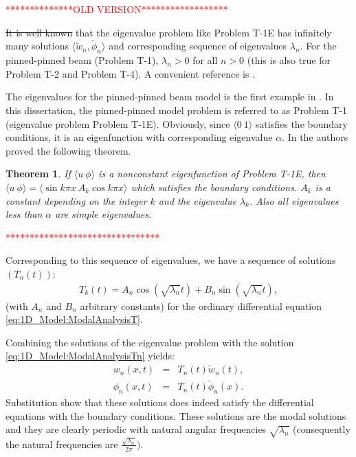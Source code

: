 \documentclass[../../main.tex]{subfiles}
\begin{document}
\textcolor{red}{**************OLD VERSION******************}

\sout{It is well known} that the eigenvalue problem like Problem T-1E has infinitely many solutions $\langle \tilde{w}_n, \tilde{\phi}_n \rangle$ and corresponding sequence of eigenvalues $\lambda_n$. For the pinned-pinned beam (Problem T-1), $\lambda_n > 0$ for all $n > 0$ (this is also true for Problem T-2 and Problem T-4). A convenient reference is \cite{VV06}.

The eigenvalues for the pinned-pinned beam model is the first example in \cite{VV06}. In this dissertation, the pinned-pinned model problem is referred to as Problem T-1 (eigenvalue problem Problem T-1E). Obviously, since $\langle 0 \ 1\rangle$ satisfies the boundary conditions, it is an eigenfunction with corresponding eigenvalue $\alpha$. In \cite{VV06} the authors proved the following theorem.

\newtheorem{ThmVV06_2}{Theorem}
\begin{ThmVV06_2}
	If $\langle u \ \phi\rangle$ is a nonconstant eigenfunction of Problem T-1E, then $\langle u \ \phi\rangle = \langle\sin k \pi x \ A_k \cos k \pi x\rangle$ which satisfies the boundary conditions. $A_k$ is a constant depending on the integer $k$ and the eigenvalue $\lambda_k$. Also all eigenvalues less than $\alpha$ are simple eigenvalues.
\end{ThmVV06_2}

\textcolor{red}{********************************} 

Corresponding to this sequence of eigenvalues, we have a sequence of solutions $(T_n(t))$:
\begin{eqnarray}
	T_k(t)=A_n\cos(\sqrt{\lambda_n}t)+B_n\sin(\sqrt{\lambda_n}t), \label{eq:1D_Model:ModalAnalysisTn}
\end{eqnarray}
(with $A_n$ and $B_n$ arbitrary constants) for the ordinary differential equation \eqref{eq:1D_Model:ModalAnalysisT}.

Combining the solutions of the eigenvalue problem with the solution \eqref{eq:1D_Model:ModalAnalysisTn} yields:
\begin{eqnarray*}
	w_n(x,t) & = & T_n(t)\tilde{w}_n(t), \\
	\phi_n(x,t) & = & T_n(t)\tilde{\phi}_n(x).
\end{eqnarray*} 
Substitution show that these solutions does indeed satisfy the differential equations with the boundary conditions. These solutions are the modal solutions and they are clearly periodic with natural angular frequencies $\sqrt{\lambda_n}$ (consequently the natural frequencies are $\frac{\sqrt{\lambda_n}}{2 \pi})$.
\end{document}
